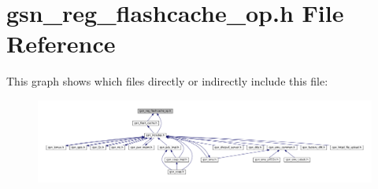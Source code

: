 \hypertarget{a00549}{
\section{gsn\_\-reg\_\-flashcache\_\-op.h File Reference}
\label{a00549}
}
This graph shows which files directly or indirectly include this file:
\nopagebreak
\begin{figure}[H]
\begin{center}
\leavevmode
\includegraphics[width=400pt]{a00785}
\end{center}
\end{figure}
